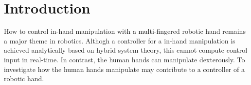 \documentclass[letterpaper, 10 pt, conference]{IEEEtran}  %
\begin{document}
\begin{abstract}

\end{abstract}


\section{Introduction}

How to control in-hand manipulation with a multi-fingered robotic hand remains a major theme in robotics. Althogh a controller for a in-hand manipulation is achieved analytically based on hybrid system theory, this cannot compute control input in real-time\cite{yingjie2005mld}. In contrast, the human hands can manipulate dexterously. To investigate how the human hands manipulate may contribute to a controller of a robotic hand.
\end{document}
